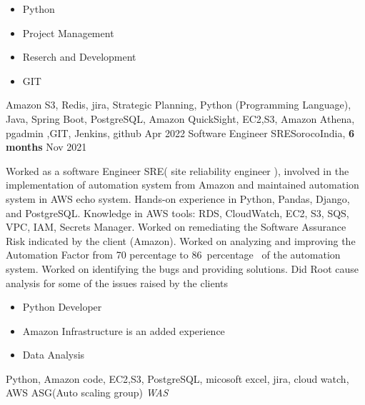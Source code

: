 \begin{experiences}
{\begin{itemize}
                        \item Python     
                        \item Project Management   
                        \item Reserch and Development   
                        \item GIT   
                      \end{itemize}
                    }
                    {
                      Amazon S3, Redis, jira, Strategic Planning, Python (Programming Language), Java, Spring Boot, PostgreSQL, Amazon QuickSight, EC2,S3, Amazon Athena, pgadmin
                      ,GIT, Jenkins, github
                    }
  \emptySeparator
  \experience
  {Apr 2022}  {Software Engineer SRE}{Soroco}{India, \textbf{6 months}}  
  {Nov 2021}   {
    Worked as a software Engineer SRE( site reliability engineer ), involved in the implementation of automation system from Amazon and maintained automation system in AWS echo system.
    Hands-on experience in Python, Pandas, Django, and PostgreSQL.
    Knowledge in AWS tools: RDS, CloudWatch, EC2, S3, SQS, VPC, IAM, Secrets Manager.
    Worked on remediating the Software Assurance Risk indicated by the client (Amazon).
    Worked on analyzing and improving the Automation Factor from 70 percentage to 86 percentage  of the automation system.
    Worked on identifying the bugs and providing solutions.
    Did Root cause analysis for some of the issues raised by the clients
                      \begin{itemize}
                        \item Python Developer                                          
                        \item Amazon Infrastructure is an added experience  
                        \item Data Analysis  
                      \end{itemize}
                  }
                  {Python, Amazon code, EC2,S3, PostgreSQL, micosoft excel, jira, cloud watch, AWS ASG(Auto scaling group) \emph{WAS}}  
\end{experiences}

